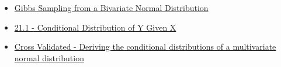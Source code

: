 \documentclass[
]{article}
\providecommand{\tightlist}{%
  \setlength{\itemsep}{0pt}\setlength{\parskip}{0pt}}
\begin{document}
\begin{itemize}
\tightlist
\item
  \href{https://www.aptech.com/resources/tutorials/bayesian-fundamentals/gibbs-sampling-from-a-bivariate-normal-distribution/}{Gibbs
  Sampling from a Bivariate Normal Distribution}
\item
  \href{https://online.stat.psu.edu/stat414/lesson/21/21.1}{21.1 -
  Conditional Distribution of Y Given X}
\item
  \href{https://stats.stackexchange.com/questions/30588/deriving-the-conditional-distributions-of-a-multivariate-normal-distribution}{Cross
  Validated - Deriving the conditional distributions of a multivariate
  normal distribution}
\end{itemize}
\end{document}
